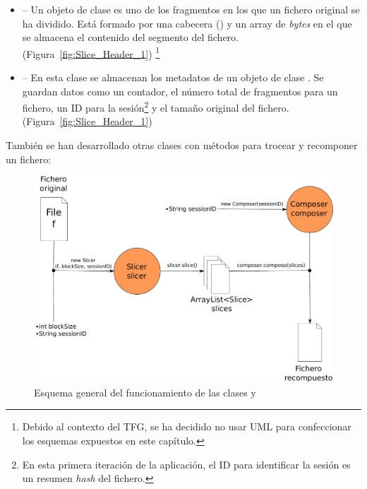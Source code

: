 \begin{itemize}
  \item {} -- Un objeto de clase  es uno de los fragmentos en los que un fichero original se ha dividido. Está formado por una cabecera () y un array de \emph{bytes} en el que se almacena el contenido del segmento del fichero. (Figura~\ref{fig:Slice_Header_1}) \footnote{Debido al contexto del TFG, se ha decidido no usar UML para confeccionar los esquemas expuestos en este capítulo.}

  \item {} -- En esta clase se almacenan los metadatos de un objeto de clase . Se guardan datos como un contador, el número total de fragmentos para un fichero, un ID para la sesión\footnote{En esta primera iteración de la aplicación, el ID para identificar la sesión es un resumen \emph{hash} del fichero.} y el tamaño original del fichero. (Figura~\ref{fig:Slice_Header_1})
\end{itemize}

También se han desarrollado otras clases con métodos para trocear y recomponer un fichero:

\begin{figure}[!htb]
  \centering
  \includegraphics[scale=0.5]{Figures/Assembler}
  \decoRule
  \caption[ - ]{Esquema general del funcionamiento de las clases  y }
  \label{fig:Assembler}
\end{figure}

